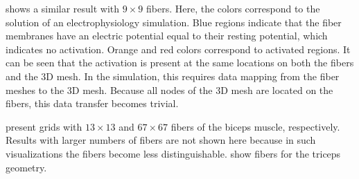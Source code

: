  shows a similar result with $9 \times 9$ fibers. Here, the colors correspond to the solution of an electrophysiology simulation. Blue regions indicate that the fiber membranes have an electric potential equal to their resting potential, which indicates no activation. Orange and red colors correspond to activated regions. It can be seen that the activation is present at the same locations on both the fibers and the 3D mesh. In the simulation, this requires data mapping from the fiber meshes to the 3D mesh. Because all nodes of the 3D mesh are located on the fibers, this data transfer becomes trivial.

 present grids with $13 \times 13$ and $67 \times 67$ fibers of the biceps muscle, respectively. Results with larger numbers of fibers are not shown here because in such visualizations the fibers become less distinguishable.  show fibers for the triceps geometry.

